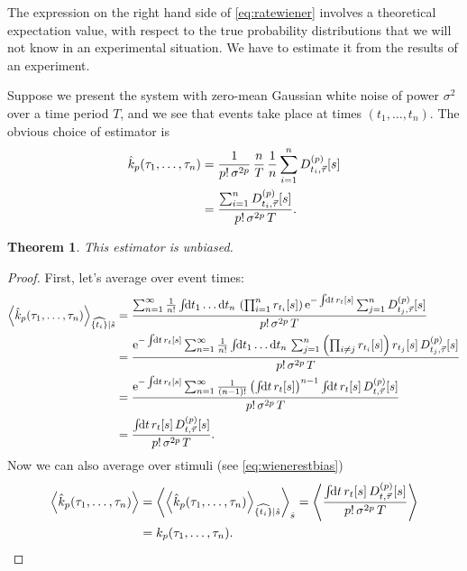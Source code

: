 \documentclass[12pt]{article}
\theoremstyle{slplain}
\newtheorem{thm}{Theorem}
\theoremstyle{sldefinition}
\theoremstyle{remark}
\begin{document}
The expression on the right hand side of \eqref{eq:ratewiener} involves a theoretical expectation value, with respect to the true probability distributions that we will not know in an experimental situation. We have to estimate it from the results of an experiment.

Suppose we present the system with zero-mean Gaussian white noise of power $\sigma^2$ over a time period $T$, and we see that events take place at times $(t_1,\ldots,t_n)$. The obvious choice of estimator is
%
\begin{equation}\label{eq:ratewienerest}
  \begin{aligned}
    \hat{k}_p(\tau_1,\ldots,\tau_n) &= \frac{1}{p!\,\sigma^{2p}} \, \frac{n}{T} \, \frac{1}{n} \sum_{i=1}^n D^{(p)}_{t_i,\vec{\tau}}[s] \\
      &= \frac{ \sum_{i=1}^n D^{(p)}_{t_i,\vec{\tau}}[s]}{p!\,\sigma^{2p}\,T}.
  \end{aligned}
\end{equation}
%

\begin{thm}
  This estimator is unbiased.
\end{thm}
\begin{proof}
  First, let's average over event times:
  \begin{equation*}
    \begin{aligned}
      \av{\hat{k}_p(\tau_1,\ldots,\tau_n)}_{\widehat{\{t_i\}}|\hat{s}}  &=
        \frac{\sum_{n=1}^\infty  \frac{1}{n!} \intd{t_1\ldots\dr t_n} \prn{\prod_{i=1}^n r_{t_i}[s]} \e^{-\intd{t}r_t[s]} \sum_{j=1}^n D\rp{p}_{t_j,\vec{\tau}}[s] }{ p! \, \sigma^{2p} \, T } \\
        &= \frac{\e^{-\intd{t}r_t[s]} \sum_{n=1}^\infty  \frac{1}{n!} \intd{t_1\ldots\dr t_n} \sum_{j=1}^n \prn{\prod_{i\neq j} r_{t_i}[s]} r_{t_j}[s] \, D\rp{p}_{t_j,\vec{\tau}}[s] }{ p! \, \sigma^{2p} \, T } \\
        &= \frac{\e^{-\intd{t}r_t[s]} \sum_{n=1}^\infty  \frac{1}{(n-1)!}  \prn{\intd{t} r_{t}[s]}^{n-1} \intd{t} r_{t}[s] \, D\rp{p}_{t,\vec{\tau}}[s] }{ p! \, \sigma^{2p} \, T } \\
        &= \frac{ \intd{t} r_{t}[s] \, D\rp{p}_{t,\vec{\tau}}[s] }{ p! \, \sigma^{2p} \, T } .
    \end{aligned}
  \end{equation*}
  Now we can also average over stimuli (see \eqref{eq:wienerestbias})
  \begin{equation*}
    \begin{aligned}
      \av{\hat{k}_p(\tau_1,\ldots,\tau_n)}  &=
        \av{ \av{\hat{k}_p(\tau_1,\ldots,\tau_n)}_{\widehat{\{t_i\}}|\hat{s}} }_{\hat{s}}
        = \av{ \frac{ \intd{t} r_{t}[s] \, D\rp{p}_{t,\vec{\tau}}[s] }{ p! \, \sigma^{2p} \, T } } \\
        &=  %
        k_p(\tau_1,\ldots,\tau_n).
    \end{aligned}
  \end{equation*}
\end{proof}
\end{document}
